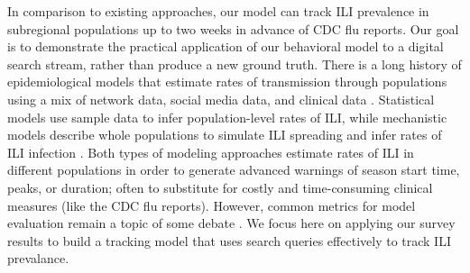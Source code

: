 \documentclass[fleqn,10pt]{wlscirep}
\begin{document}
In comparison to existing approaches, our model can track ILI prevalence in subregional populations up to two weeks in advance of CDC flu reports. Our goal is to demonstrate the practical application of our behavioral model to a digital search stream, rather than produce a new ground truth. There is a long history of epidemiological models that estimate rates of transmission through populations using a mix of network data, social media data, and clinical data \cite{ginsberg_etal_2009,culotta2010towards,bodnar2013validating,nsoesie2014guess,generous2014global,yang_etal_2015inference,yang_etal_2015,biggerstaff_etal_2016,zhang2017forecasting}. Statistical models use sample data to infer population-level rates of ILI, while mechanistic models describe whole populations to simulate ILI spreading and infer rates of ILI infection \cite{biggerstaff_etal_2016}. Both types of modeling approaches estimate rates of ILI in different populations in order to generate advanced warnings of season start time, peaks, or duration; often to substitute for costly and time-consuming clinical measures (like the CDC flu reports). However, common metrics for model evaluation remain a topic of some debate \cite{biggerstaff_etal_2016}. We focus here on applying our survey results to build a tracking model that uses search queries effectively to track ILI prevalance. 


\end{document}
